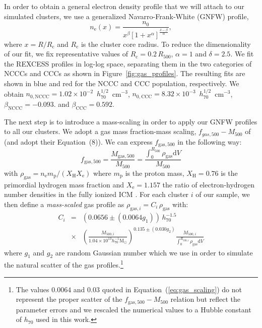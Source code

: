 \documentclass[traditabstract]{aa}
\newcommand{\rmn}{\mathrm}
\begin{document}
In order to obtain a general electron density profile that we will attach to our
simulated clusters, we use a generalized Navarro-Frank-White (GNFW) profile,
\begin{equation}
n_{\rmn{e}}(x) = \frac{n_{0}}{x^{\beta}\left[1+x^{\alpha}\right]^{\frac{\delta-\beta}{\alpha}}},
\label{eq:gnfw}
\end{equation}
where $x=R/R_{\rmn{c}}$ and $R_{\rmn{c}}$ is the cluster core radius. To reduce
the dimensionality of our fit, we fix representative values of $R_{\rmn{c}} =
0.2\, R_{500}$, $\alpha = 1$ and $\delta = 2.5$. We fit the REXCESS profiles in
log-log space, separating them in the two categories of NCCCs and CCCs as shown
in Figure~\ref{fig:gas_profiles}. The resulting fits are shown in blue and red
for the NCCC and CCC population, respectively. We obtain $n_{\rmn{0,NCCC}} =
1.02\times10^{-2}$~$h_{70}^{1/2}$~cm$^{-3}$, $n_{\rmn{0,CCC}} =
8.32\times10^{-3}$~$h_{70}^{1/2}$~cm$^{-3}$, $\beta_{\rmn{NCCC}} = -0.093$. and
$\beta_{\rmn{CCC}} = 0.592$.

The next step is to introduce a mass-scaling in order to apply our GNFW profiles
to all our clusters. We adopt a gas mass fraction-mass scaling,
$f_{gas,500}-M_{500}$ of \cite{2009ApJ...693.1142S} (and adopt their Equation~(8)). We can
express $f_{\rmn{gas},500}$ in the following way:
\begin{equation}
f_{\rmn{gas},500} = \frac{M_{\rmn{gas},500}}{M_{500}}  = \frac{\int_{0}^{R_{500}} \rho_{\rmn{gas}} \rmn{d}V}{M_{500}}
\label{eq:m500}
\end{equation}
with $\rho_{\rmn{gas}} = n_{\rmn{e}} m_{\rmn{p}} / ( X_{\rmn{H}}X_{\rmn{e}} )$ where
$m_{\rmn{p}}$ is the proton mass, $X_{\rmn{H}} = 0.76$ is the primordial hydrogen
mass fraction and $X_{\rmn{e}} = 1.157$ the ratio of electron-hydrogen number
densities in the fully ionized ICM \citep{1988xrec.book.....S}. For each cluster
$i$ of our sample, we then define a \emph{mass-scaled} gas profile as
$\rho_{\rmn{gas},i}=C_{i} \,\rho_{\rmn{gas}}$ with:
\begin{eqnarray}
C_{i}  & = &  (0.0656\pm(0.0064g_{1})) \, h_{70}^{-1.5}  \nonumber \\
 & \times & \left(\frac{M_{500,i}}{1.04 \times 10^{13} h_{70}^{-1} \rmn{M_{\odot}}}\right)^{0.135\pm(0.030g_{2})} \frac{M_{500,i}}{\int_{0}^{R_{500,i}} \rho_{\rmn{gas}} \rmn{d}V}
\label{eq:gas_scaling}
\end{eqnarray}
where $g_{1}$ and $g_{2}$ are random Gaussian number which we use in order to
simulate the natural scatter of the gas profiles.\footnote[4]{The values
  $0.0064$ and $0.03$ quoted in Equation~(\ref{eq:gas_scaling}) do not represent
  the proper scatter of the $f_{\rmn{gas},500}-M_{500}$ relation but reflect the
  parameter errors and we rescaled the numerical values to a Hubble constant of
  $h_{70}$ used in this work.}
\end{document}
